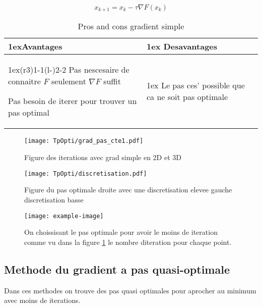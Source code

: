 \[x_{k+1} = x_k - \tau \nabla F(x_k)\]

\begin{table}[H]
    \begin{tabularx}{\linewidth}{>{\parskip1ex}X@{\kern4\tabcolsep}>{\parskip1ex}X}
    \toprule
    \hfil\bfseries Avantages
    &
    \hfil\bfseries Desavantages
    \\\cmidrule(r{3\tabcolsep}){1-1}\cmidrule(l{-\tabcolsep}){2-2}
    Pas nescesaire de connaitre $F$ seulement $\nabla F$ suffit\par
    Pas besoin de iterer pour trouver un pas optimal\par
    &
    Le pas ces' possible que ca ne soit pas optimale\par
    \\\bottomrule
    \end{tabularx}
    \caption{Pros and cons gradient simple}
\end{table}

\begin{figure}[H]
    \centering
    \texttt{[image: TpOpti/grad\_pas\_cte1.pdf]}
    \caption{Figure des iterations avec grad simple en 2D et 3D}
\end{figure}

\begin{figure}[H]
    \centering
    \texttt{[image: TpOpti/discretisation.pdf]}
    \caption{Figure du pas optimale droite avec une discretisation elevee gauche discretisation basse}
    \label{fig_optimal_pas_graphe_discretisations}
\end{figure}

\begin{figure}[H]
    \centering
    \texttt{[image: example-image]}
    \caption{On choissisant le pas optimale pour avoir le moins de iteration comme vu dans la figure \ref{fig_optimal_pas_graphe_discretisations} le nombre diteration pour chaque point.}
\end{figure}

\subsection{Methode du gradient a pas quasi-optimale}
Dans ces methodes on trouve des pas quasi optimales pour aprocher au minimum avec moins de iterations.
